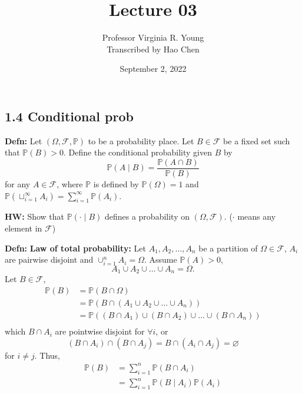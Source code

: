 \documentclass[a4paper]{article}
\title{Lecture 03}
\author{Professor Virginia R. Young\\ \small{Transcribed by Hao Chen}}
\date{September 2, 2022}
\newcommand{\n}{\hfill\break}
\newcommand{\defn}[1]{\par\noindent\settowidth{\hangindent}{\textbf{Defn: }}\textbf{Defn: }#1\n}
\newcommand{\hw}[1]{\par\noindent\settowidth{\hangindent}{\textbf{HW: }}\textbf{HW: }#1\n}
\newcommand{\F}{\mathcal F}
\newcommand{\Prob}{\mathbb{P}}
\renewcommand{\P}{\Prob}
\begin{document}
\maketitle

\subsection*{1.4 Conditional prob}

\defn{ Let $(\Omega, \F, \P)$ to be a probability place. Let $B\in\F$ be a fixed set such that $\P(B)>0$. Define the conditional probability given $B$ by \[\P(A\mid B)=\frac{\P(A\cap B)}{\P(B)}\]for any $A\in\F$, where $\P$ is defined by $\P(\Omega)=1$ and $\P(\sqcup^\infty_{i=1}A_i)=\sum^\infty_{i=1}\P(A_i)$.
}

\hw{Show that $\P(\cdot\mid B)$ defines a probability on $(\Omega, \F)$.  ($\cdot$ means any element in $\F$)}

\defn{\textbf{Law of total probability:} Let $A_1, A_2, \dots, A_n$ be a partition of $\Omega\in\F$, $A_i$ are pairwise disjoint and $\cup^n_{i=1}A_i=\Omega$. Assume $\P(A)>0$, \[A_1\cup A_2\cup\dots\cup A_n=\Omega.\] Let $B\in\F$, 
\begin{align*}
    \P(B)&=\P(B\cap\Omega) \\
    &=\P(B\cap(A_1\cup A_2\cup\dots\cup A_n)) \\
    &=\P((B\cap A_1)\cup(B\cap A_2)\cup\dots\cup(B\cap A_n)) \\
\end{align*}
which $B\cap A_i$ are pointwise disjoint for $\forall i$, or 
\[(B\cap A_i)\cap(B\cap A_j)=B\cap(A_i\cap A_j)=\varnothing\]
for $i\neq j$. Thus, 
\begin{align*}
    \P(B)&=\sum^n_{i=1}\P(B\cap A_i) \\
    &=\sum^n_{i=1}\P(B\mid A_i)\P(A_i)
\end{align*}
}

\end{document}
